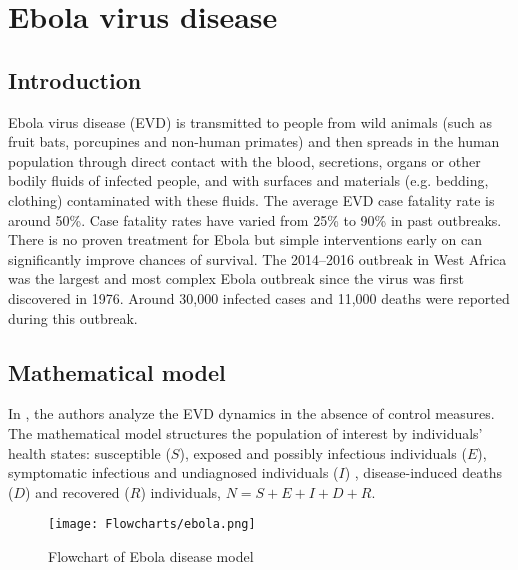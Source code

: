 \documentclass{book}\usepackage[]{graphicx}\usepackage[]{color}
\begin{document}


\section{Ebola virus disease}
\subsection*{Introduction}
Ebola virus disease (EVD) is transmitted to people from wild animals (such as fruit bats, porcupines and non-human primates) and then spreads in the human population through direct contact with the blood, secretions, organs or other bodily fluids of infected people, and with surfaces and materials (e.g. bedding, clothing) contaminated with these fluids.
%
The average EVD case fatality rate is around 50\%. Case fatality rates have varied from 25\% to 90\% in past outbreaks. There is no proven treatment for Ebola but simple interventions early on can significantly improve chances of survival.
%
The 2014–2016 outbreak in West Africa was the largest and most complex Ebola outbreak since the virus was first discovered in 1976. Around 30,000 infected cases and 11,000 deaths were reported during this outbreak.

\subsection*{Mathematical model}
In \cite{espinoza2018consequences}, the authors analyze the EVD dynamics in the absence of control measures. The mathematical model structures the population of interest by individuals' health states:
susceptible ($S$), exposed and possibly infectious individuals ($E$), symptomatic infectious and undiagnosed individuals ($I$) , disease-induced deaths ($D$) and recovered ($R$) individuals, $N=S+E+I+D+R$. 

\begin{figure}[H]
    \centering
    \texttt{[image: Flowcharts/ebola.png]}
    \caption{Flowchart of Ebola disease model}
    \label{fig:ebola_flow}
\end{figure}
\end{document}
